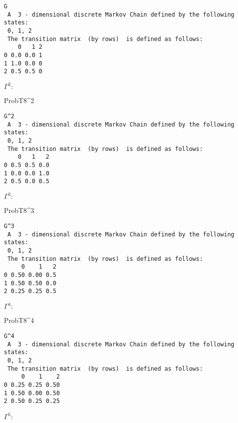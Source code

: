 \documentclass[
]{article}
\newenvironment{Shaded}{\begin{snugshade}}{\end{snugshade}}
\newcommand{\DecValTok}[1]{\textcolor[rgb]{0.00,0.00,0.81}{#1}}
\newcommand{\NormalTok}[1]{#1}
\newcommand{\OperatorTok}[1]{\textcolor[rgb]{0.81,0.36,0.00}{\textbf{#1}}}
\begin{document}
\begin{verbatim}
G 
 A  3 - dimensional discrete Markov Chain defined by the following states: 
 0, 1, 2 
 The transition matrix  (by rows)  is defined as follows: 
    0   1 2
0 0.0 0.0 1
1 1.0 0.0 0
2 0.5 0.5 0
\end{verbatim}

\(\Gamma^2:\)

\begin{Shaded}
\begin{Highlighting}[]
\NormalTok{ProbT8}\OperatorTok{^}\DecValTok{2}
\end{Highlighting}
\end{Shaded}

\begin{verbatim}
G^2 
 A  3 - dimensional discrete Markov Chain defined by the following states: 
 0, 1, 2 
 The transition matrix  (by rows)  is defined as follows: 
    0   1   2
0 0.5 0.5 0.0
1 0.0 0.0 1.0
2 0.5 0.0 0.5
\end{verbatim}

\(\Gamma^3:\)

\begin{Shaded}
\begin{Highlighting}[]
\NormalTok{ProbT8}\OperatorTok{^}\DecValTok{3}
\end{Highlighting}
\end{Shaded}

\begin{verbatim}
G^3 
 A  3 - dimensional discrete Markov Chain defined by the following states: 
 0, 1, 2 
 The transition matrix  (by rows)  is defined as follows: 
     0    1   2
0 0.50 0.00 0.5
1 0.50 0.50 0.0
2 0.25 0.25 0.5
\end{verbatim}

\(\Gamma^4:\)

\begin{Shaded}
\begin{Highlighting}[]
\NormalTok{ProbT8}\OperatorTok{^}\DecValTok{4}
\end{Highlighting}
\end{Shaded}

\begin{verbatim}
G^4 
 A  3 - dimensional discrete Markov Chain defined by the following states: 
 0, 1, 2 
 The transition matrix  (by rows)  is defined as follows: 
     0    1    2
0 0.25 0.25 0.50
1 0.50 0.00 0.50
2 0.50 0.25 0.25
\end{verbatim}

\(\Gamma^5:\)
\end{document}
